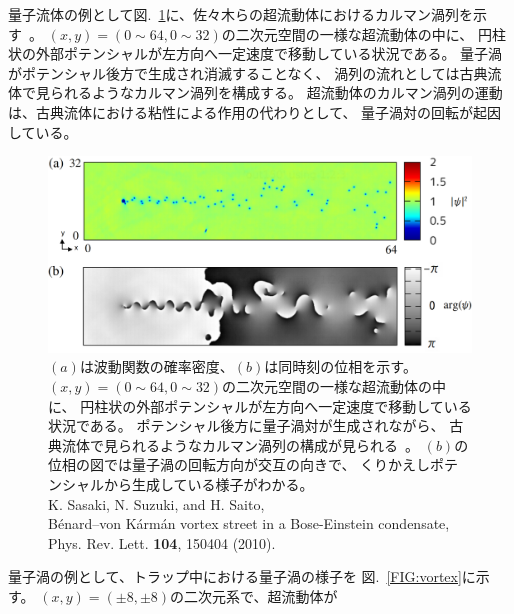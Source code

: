 \documentclass[12pt,a4paper]{jbook}
\begin{document}
        
        量子流体の例として図.~\ref{FIG:karman}に、佐々木らの超流動体におけるカルマン渦列を示す~\cite{Sasaki1}。
        $(x,y)=(0 \sim 64, 0 \sim 32)$の二次元空間の一様な超流動体の中に、
		円柱状の外部ポテンシャルが左方向へ一定速度で移動している状況である。
		量子渦がポテンシャル後方で生成され消滅することなく、
        渦列の流れとしては古典流体で見られるようなカルマン渦列を構成する。
        超流動体のカルマン渦列の運動は、古典流体における粘性による作用の代わりとして、
        量子渦対の回転が起因している。
		\begin{figure}[H]
			\begin{center}
				\includegraphics[width=16cm]{karman.eps}
				\caption{
					$(a)$は波動関数の確率密度、$(b)$は同時刻の位相を示す。
                    $(x,y)=(0 \sim 64, 0 \sim 32)$の二次元空間の一様な超流動体の中に、
		            円柱状の外部ポテンシャルが左方向へ一定速度で移動している状況である。
                    ポテンシャル後方に量子渦対が生成されながら、
					古典流体で見られるようなカルマン渦列の構成が見られる~\cite{Sasaki1}。
                    $(b)$の位相の図では量子渦の回転方向が交互の向きで、
                    くりかえしポテンシャルから生成している様子がわかる。
                    \\
		            K. Sasaki, N. Suzuki, and H. Saito,
                    \\
		            B\'enard--von K\'arm\'an vortex street in a Bose-Einstein condensate,
                    \\
		            Phys. Rev. Lett. \textbf{104}, 150404 (2010).
				}
				\label{FIG:karman}
			\end{center}
		\end{figure}
        量子渦の例として、トラップ中における量子渦の様子を
        図.~\ref{FIG:vortex}に示す。
        $(x,y)=(\pm8,\pm8)$の二次元系で、超流動体が
\end{document}

